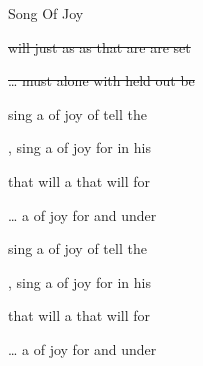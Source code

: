 \begin{SBSong}{Song Of Joy}
\begin{SBVerse}
    \sout{  will  just as  as 
    that are  are  set }

    \sout{\ldots {} must  alone with 
    held out be }
  \end{SBVerse}
  \begin{SBVerse}
     sing a  of joy of 
    tell the 

    , sing a  of joy for 
    in his 
  \end{SBVerse}
  \begin{SBVerse}
       that will  a 
    that will  for 

    \ldots {} a  of joy for 
    and under
  \end{SBVerse}
  \begin{SBVerse}
     sing a  of joy of 
    tell the 

    , sing a  of joy for 
    in his 
  \end{SBVerse}
  \begin{SBVerse}
       that will  a 
    that will  for 

    \ldots {} a  of joy for  
    and under
  \end{SBVerse}
\end{SBSong}
